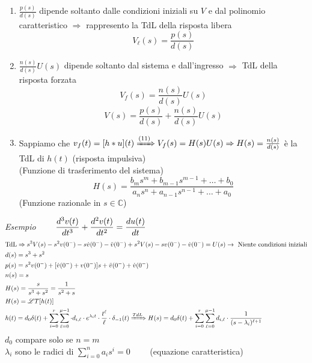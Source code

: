       \begin{osservazione}
         \begin{enumerate}
            \item $\displaystyle\frac{p(s)}{d(s)}$ dipende soltanto dalle condizioni iniziali su $V$ e dal polinomio caratteristico $\Rightarrow$ rappresento la TdL della risposta libera
               \[V_\ell(s) = \frac{p(s)}{d(s)}\]
            \item $\displaystyle\frac{n(s)}{d(s)}U(s)$ dipende soltanto dal sistema e dall'ingresso $\Rightarrow$ TdL della risposta forzata
               \[V_f(s) = \frac{n(s)}{d(s)}U(s)\]
               \[V(s) = \frac{p(s)}{d(s)} + \frac{n(s)}{d(s)}U(s)\]
            \item Sappiamo che $v_f(t) = [h * u](t) \xRightarrow{(11)} V_f(s) = H(s)U(s) \Rightarrow H(s) = \frac{n(s)}{d(s)}$ è la TdL di $h(t)$ (risposta impulsiva)\\
            (Funzione di trasferimento del sistema)
            \[H(s) = \frac{b_ms^m + b_{m - 1}s^{m - 1} + \dots + b_0}{a_ns^n + a_{n - 1}s^{n - 1} + \dots + a_0}\]
            (Funzione razionale in $s \in \mathbb{C}$)
         \end{enumerate}
      \end{osservazione}
      \emph{Esempio} $\qquad\displaystyle\frac{d^{3}v(t)}{dt^{3}} + \frac{d^{2}v(t)}{dt^{2}} = \frac{du(t)}{dt}$
      \[
         \begin{split}
            &\mathrm{TdL} \Rightarrow s^3V(s) - s^2v(0^-) - s\dot{v}(0^-) - \ddot{v}(0^-) + s^2V(s) - sv(0^-) - \dot{v}(0^-) = U(s) \rightarrow \mathrm{\,\,Niente\,\,condizioni\,\,iniziali}\\
            &d(s) = s^3 + s^2\\
            &p(s) = s^2v(0^-) + [\dot{v}(0^-) + v(0^-)]s + \ddot{v}(0^-) + \dot{v}(0^-)\\
            &n(s) = s\\
            &H(s) = \frac{s}{s^3 + s^2} = \frac{1}{s^2 + s}\\
            &H(s) = \mathscr{L}T[h(t)]\\
            &h(t) = d_0\delta(t) + \sum_{i = 0}^{r}\sum_{\ell = 0}^{\mu - 1}\cdot d_{i,\ell}\cdot e^{\lambda_it}\cdot\frac{t^\ell}{\ell}\cdot\delta_{-1}(t)\xRightarrow{TdL} H(s) = d_0\delta(t) + \sum_{i = 0}^{r}\sum_{\ell = 0}^{\mu - 1}d_{i, \ell}\cdot\frac{1}{(s - \lambda_i)^{\ell + 1}}
            \end{split}
      \]
      $d_0$ compare solo se $n = m$\\
      $\lambda_i$ sono le radici di $\displaystyle\sum_{i = 0}^{n}a_is^i = 0\qquad$ (equazione caratteristica)\\
